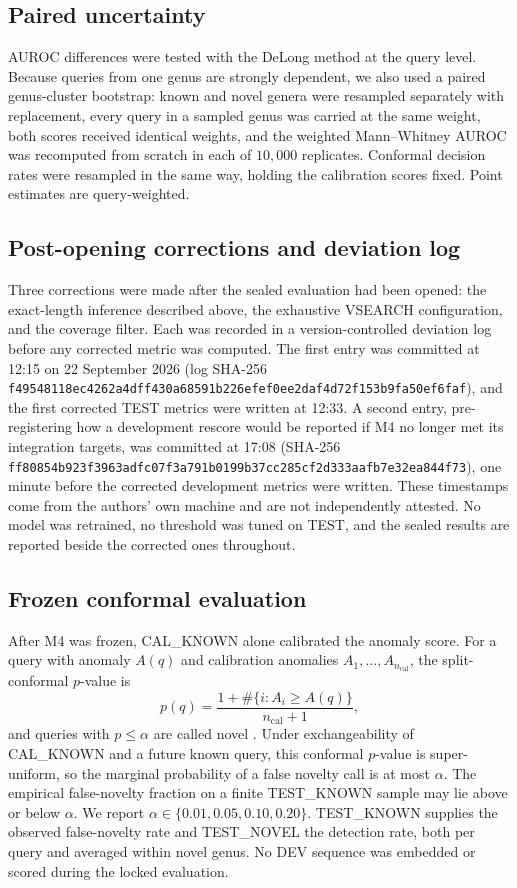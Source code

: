\documentclass[11pt]{article}
\begin{document}
\subsection{Paired uncertainty}
\label{sec:uncertainty}
AUROC differences were tested with the DeLong method \cite{delong1988} at the
query level. Because queries from one genus are strongly dependent, we also used
a paired genus-cluster bootstrap: known and novel genera were resampled
separately with replacement, every query in a sampled genus was carried at the
same weight, both scores received identical weights, and the weighted
Mann--Whitney AUROC was recomputed from scratch in each of $10{,}000$
replicates. Conformal decision rates were resampled in the same way, holding the
calibration scores fixed. Point estimates are query-weighted.

\subsection{Post-opening corrections and deviation log}
\label{sec:deviations}
Three corrections were made after the sealed evaluation had been opened: the
exact-length inference described above, the exhaustive VSEARCH configuration,
and the coverage filter. Each was recorded in a version-controlled deviation log
before any corrected metric was computed. The first entry was committed at 12:15
on 22 September 2026 (log SHA-256
\nolinkurl{f49548118ec4262a4dff430a68591b226efef0ee2daf4d72f153b9fa50ef6faf}),
and the first corrected TEST metrics were written at 12:33. A second entry,
pre-registering how a development rescore would be reported if M4 no longer met
its integration targets, was committed at 17:08 (SHA-256
\nolinkurl{ff80854b923f3963adfc07f3a791b0199b37cc285cf2d333aafb7e32ea844f73}),
one minute before the corrected development metrics were written. These
timestamps come from the authors' own machine and are not independently
attested. No model was
retrained, no threshold was tuned on TEST, and the sealed results are reported
beside the corrected ones throughout.

\subsection{Frozen conformal evaluation}
After M4 was frozen, CAL\_KNOWN alone calibrated the anomaly score. For a query
with anomaly $A(q)$ and calibration anomalies $A_1,\dots,A_{n_{\mathrm{cal}}}$,
the split-conformal $p$-value is
\begin{equation}
p(q)=\frac{1+\#\{i: A_i\ge A(q)\}}{n_{\mathrm{cal}}+1},
\label{eq:conformal}
\end{equation}
and queries with $p\le\alpha$ are called novel \cite{vovk2005,angelopoulos2023conformal}.
Under exchangeability of CAL\_KNOWN and a future known query, this conformal
$p$-value is super-uniform, so the marginal probability of a false novelty call
is at most $\alpha$. The empirical false-novelty fraction on a finite TEST\_KNOWN
sample may lie above or below $\alpha$. We report
$\alpha\in\{0.01,0.05,0.10,0.20\}$. TEST\_KNOWN supplies the observed
false-novelty rate and TEST\_NOVEL the detection rate, both per query and
averaged within novel genus. No DEV sequence was embedded or scored during the
locked evaluation.
\end{document}
